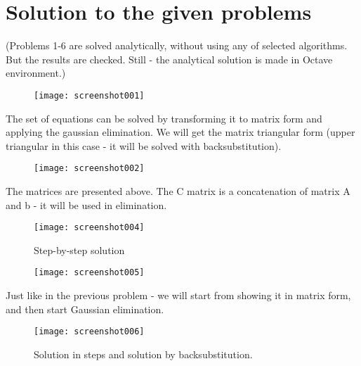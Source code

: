 \documentclass[eng,openany]{mgr}
\author{Jaroslaw M. Szumega}
\title{}
\date{14.03.2017}
\begin{document}
\maketitle

\newpage

\chapter{Solution to the given problems}
(Problems 1-6 are solved analytically, without using any of selected algorithms. But the results are checked.
Still - the analytical solution is made in Octave environment.)

\begin{figure}[h]
\centering
\texttt{[image: screenshot001]}
\label{fig:screenshot001}
\end{figure}

The set of equations can be solved by transforming it to matrix form and applying the gaussian elimination. We will get the matrix triangular form (upper triangular in this case - it will be solved with backsubstitution).

\begin{figure}[h]
\centering
\texttt{[image: screenshot002]}
\label{fig:screenshot002}
\end{figure}

The matrices are presented above. The C matrix is a concatenation of matrix A and b - it will be used in elimination.\\
\begin{figure}
\centering
\texttt{[image: screenshot004]}
\caption{Step-by-step solution}
\label{fig:screenshot004}
\end{figure}

\newpage
\begin{figure}
\centering
\texttt{[image: screenshot005]}
\caption{}
\label{fig:screenshot005}
\end{figure}

Just like in the previous problem - we will start from showing it in matrix form, and then start Gaussian elimination.

\begin{figure}[h]
\centering
\texttt{[image: screenshot006]}
\caption{Solution in steps and solution by backsubstitution.}
\label{fig:screenshot006}
\end{figure}
\newpage
\end{document}
